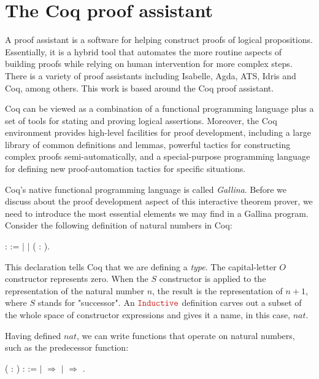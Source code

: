 \section{The Coq proof assistant}
\label{section:coq}

A proof assistant is a software for helping construct proofs of logical propositions. Essentially, it is a hybrid tool that automates the more routine aspects of building proofs while relying on human intervention for more complex steps. There is a variety of proof assistants including Isabelle, Agda, ATS, Idris and Coq, among others. This work is based around the Coq proof assistant. 

Coq can be viewed as a combination of a functional programming language plus a set of tools for stating and proving logical assertions. Moreover, the Coq environment provides high-level facilities for proof development, including a large library of common definitions and lemmas, powerful tactics for constructing complex proofs semi-automatically, and a special-purpose programming language for defining new proof-automation tactics for specific situations.

Coq's native functional programming language is called \emph{Gallina}. Before we discuss about the proof development aspect of this interactive theorem prover, we need to introduce the most essential elements we may find in a Gallina program. Consider the following definition of natural numbers in Coq:

\begin{coqdoccode}
	\coqdocnoindent
	  :  :=\coqdoceol
	\coqdocindent{1.00em}
	\ensuremath{|} \coqdoceol
	\coqdocindent{1.00em}
	\ensuremath{|}  ( : ).\coqdoceol
\end{coqdoccode}

This declaration tells Coq that we are defining a \emph{type}. The capital-letter $ O $ constructor represents zero. When the $ S $ constructor is applied to the representation of the natural number $ n $, the result is the representation of $ n+1 $, where $ S $ stands for "successor". An $ \coqdockw{Inductive} $ definition carves out a subset of the whole space of constructor expressions and gives it a name, in this case, $ nat $. 

Having defined $ nat $, we can write functions that operate on natural numbers, such as the predecessor function:

\begin{coqdoccode}
	\coqdocnoindent
	  ( : ) :  :=\coqdoceol
	\coqdocindent{1.00em}
	  \coqdoceol
	\coqdocindent{2.00em}
	\ensuremath{|}  \ensuremath{\Rightarrow} \coqdoceol
	\coqdocindent{2.00em}
	\ensuremath{|}   \ensuremath{\Rightarrow} \coqdoceol
	\coqdocindent{1.00em}
	.\coqdoceol
\end{coqdoccode}

